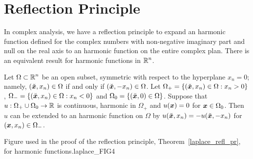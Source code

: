 \section{Reflection Principle}

In complex analysis, we have a reflection principle to expand an
harmonic function defined for the complex numbers with non-negative
imaginary part and null on the real axis to an harmonic function on
the entire complex plan.  There is an equivalent result for harmonic
functions in $\displaystyle \mathbb{R}^n$.

\begin{theorem} \label{laplace_refl_pr}
Let $\displaystyle \Omega \subset \mathbb{R}^n$ be an open subset, symmetric
with respect to the hyperplane $x_n=0$; namely,
$(\breve{{\bm{x}}},x_n) \in \Omega$ if and only if 
$(\breve{{\bm{x}}},-x_n) \in \Omega$.  Let
$\displaystyle \Omega_+
= \left\{ (\breve{{\bm{x}}},x_n) \in \Omega : x_n>0 \right\}$,
$\displaystyle \Omega_-
= \left\{ (\breve{{\bm{x}}},x_n) \in \Omega : x_n<0 \right\}$ and
$\displaystyle \Omega_0 = \left\{ (\breve{{\bm{x}}},0) \in \Omega \right\}$.
Suppose that $u:\Omega_+\cup \Omega_0 \rightarrow \mathbb{R}$ is continuous,
harmonic in $\Omega_+$ and $u({\bm{x}})=0$ for ${\bm{x}} \in \Omega_0$.
Then $u$ can be extended to an harmonic function on $\Omega$ by
$u(\breve{{\bm{x}}},x_n) = -u(\breve{{\bm{x}}},-x_n)$ for
$({\bm{x}},x_n)\in \Omega_-$.
\end{theorem}

{Figure used in the proof of the reflection principle,
Theorem~\ref{laplace_refl_pr}, for harmonic functions.}{laplace_FIG4}


